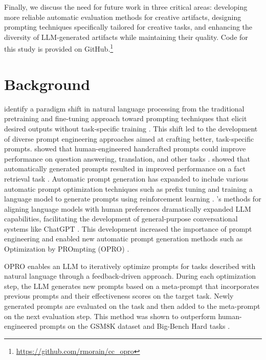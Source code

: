 \documentclass[phd,electronic,oneside,twosidetoc,letterpaper,chaptercenter,parttop,lof]{byumsphd}
\begin{document}
Finally, we discuss the need for future work in three critical areas: developing more reliable automatic evaluation methods for creative artifacts, designing prompting techniques specifically tailored for creative tasks, and enhancing the diversity of LLM-generated artifacts while maintaining their quality. Code for this study is provided on GitHub.\footnote{\url{https://github.com/rmorain/cc_opro}}

\section{Background}

\citeauthor{liu2023prompt} identify a paradigm shift in natural language processing from the traditional pretraining and fine-tuning approach toward prompting techniques that elicit desired outputs without task-specific training \cite{liu2023prompt}. This shift led to the development of diverse prompt engineering approaches aimed at crafting better, task-specific prompts. \citeauthor{brown2020gpt3} showed that human-engineered handcrafted prompts could improve performance on question answering, translation, and other tasks \cite{brown2020gpt3}. \citeauthor{shin2020autoprompt} showed that automatically generated prompts resulted in improved performance on a fact retrieval task \cite{shin2020autoprompt}. 
Automatic prompt generation has expanded to include various automatic prompt optimization techniques such as prefix tuning \cite{li-liang-2021-prefix} and training a language model to generate prompts using reinforcement learning \cite{deng2022rlprompt}. \citeauthor{ouyang2022rlhf}'s methods for aligning language models with human preferences \cite{ouyang2022rlhf} dramatically expanded LLM capabilities, facilitating the development of general-purpose conversational systems like ChatGPT \cite{chatGPT}. This development increased the importance of prompt engineering and enabled new automatic prompt generation methods such as Optimization by PROmpting (OPRO) \cite{yang2024opro}. 	

OPRO enables an LLM to iteratively optimize prompts for tasks described with natural language through a feedback-driven approach. During each optimization step, the LLM generates new prompts based on a meta-prompt that incorporates previous prompts and their effectiveness scores on the target task. Newly generated prompts are evaluated on the task and then added to the meta-prompt on the next evaluation step. This method was shown to outperform human-engineered prompts on the GSM8K dataset \cite{cobbe2023gsm8k} and Big-Bench Hard tasks \cite{suzgun-etal-2023-challenging}. 
\end{document}
